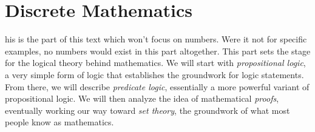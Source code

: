 \part{Discrete Mathematics}

his is the part of this text which won't focus on numbers.
Were it not for specific examples, no numbers would exist in this part altogether.
This part sets the stage for the logical theory behind mathematics. We will start with \emph{propositional logic}, a very simple form of logic that establishes the groundwork for logic statements.
From there, we will describe \emph{predicate logic}, essentially a more powerful variant of propositional logic.
We will then analyze the idea of mathematical \emph{proofs}, eventually working our way toward \emph{set theory}, the groundwork of what most people know as mathematics.

\clearpage
{}

\setcounter{section}{0}

%
%
%
%
%
%
